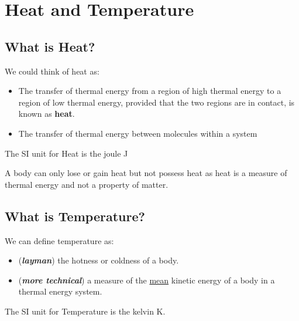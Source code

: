 \chapter{Heat and Temperature}
    \section{What is Heat?}
    We could think of heat as:
    \begin{itemize}
        \item The transfer of thermal energy from a region of high thermal
        energy to a region of low thermal energy, provided that the two regions
        are in contact, is known as \textbf{heat}.
        \item The transfer of thermal energy between molecules within a system
    \end{itemize}
    The SI unit for Heat is the joule \unit{J}
    \begin{tcolorbox}[colback=yellow!30!white,
                      colframe=yellow!70!black,
                      title={Just a heads up...}]
        A body can only lose or gain heat but not possess heat as heat is a
        measure of thermal energy and not a property of matter.
    \end{tcolorbox}
    \section{What is Temperature?}
    We can define temperature as:
    \begin{itemize}
        \item (\textbf{\textit{layman}}) the hotness or coldness of a body.
        \item (\textbf{\textit{more technical}}) a measure of the
        \underline{mean} kinetic energy of a body in a thermal energy system.
    \end{itemize}
    The SI unit for Temperature is the kelvin \unit{K}.

